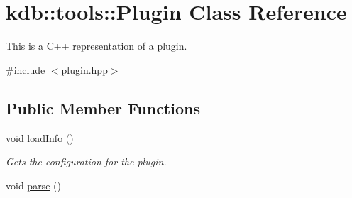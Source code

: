 \hypertarget{classkdb_1_1tools_1_1Plugin}{\section{kdb\+:\+:tools\+:\+:Plugin Class Reference}
\label{classkdb_1_1tools_1_1Plugin}
}


This is a C++ representation of a plugin.  




{\ttfamily \#include $<$plugin.\+hpp$>$}

\subsection*{Public Member Functions}
\begin{DoxyCompactItemize}
\item 
\hypertarget{classkdb_1_1tools_1_1Plugin_a3a0c6a956d1714002ef9baf8c9d99167}{void \hyperlink{classkdb_1_1tools_1_1Plugin_a3a0c6a956d1714002ef9baf8c9d99167}{load\+Info} ()}\label{classkdb_1_1tools_1_1Plugin_a3a0c6a956d1714002ef9baf8c9d99167}

\begin{DoxyCompactList}\small\item\em Gets the configuration for the plugin. \end{DoxyCompactList}\item 
\hypertarget{classkdb_1_1tools_1_1Plugin_adfcba2fbdeb436a1083410df804d5fb0}{void \hyperlink{classkdb_1_1tools_1_1Plugin_adfcba2fbdeb436a1083410df804d5fb0}{parse} ()}\label{classkdb_1_1tools_1_1Plugin_adfcba2fbdeb436a1083410df804d5fb0}


\end{DoxyCompactItemize}

